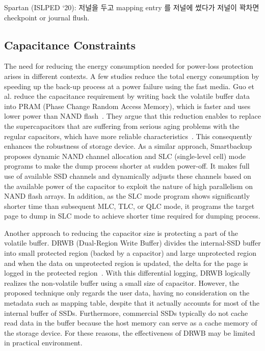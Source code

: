 Spartan (ISLPED ‘20): 저널을 두고 mapping entry 를 저널에 썼다가 저널이 꽉차면 checkpoint or journal flush. 
\fi


\subsection{Capacitance Constraints}
The need for reducing the energy consumption needed for power-loss protection
arises in different contexts. A few studies reduce the total energy consumption
by speeding up the back-up process at a power failure using the fast media. Guo
et al. reduce the capacitance requirement by writing back the volatile buffer
data into PRAM (Phase Change Random Access Memory), which is faster and uses
lower power than NAND flash~\cite{GuoYZC13date}. They argue that this reduction
enables to replace the supercapacitors that are suffering from serious aging
problems with the regular capacitors, which have more reliable
characteristics~\cite{huang2011life}. This consequently enhances the robustness
of storage device.  As a similar approach, Smartbackup~\cite{HuangWQLS15hpcc}
proposes dynamic NAND channel allocation and SLC (single-level cell) mode
programs to make the dump process shorter at sudden power-off. It makes full
use of available SSD channels and dynamically adjusts these channels based on
the available power of the capacitor to exploit the nature of high parallelism
on NAND flash arrays.  In addition, as the SLC mode program shows significantly
shorter time than subsequent MLC, TLC, or QLC mode, it programs the target page
to dump in SLC mode to achieve shorter time required for dumping process.


Another approach to reducing the capacitor size is protecting a part of the 
volatile buffer. DRWB (Dual-Region Write Buffer) divides the internal-SSD
buffer into small protected region (backed by a capacitor) and large
unprotected region and when the data on unprotected region is updated, the 
delta for the page is logged in the protected region~\cite{KimK15sac}.  With
this differential logging, DRWB logically realizes the non-volatile buffer
using a small size of capacitor. However, the proposed technique only regards
the user data, having no consideration on the metadata such as mapping table, 
despite that it actually accounts for most of the internal buffer of SSDs.  Furthermore,
commercial SSDs typically do not cache read data in the buffer because the host
memory can serve as a cache memory of the storage device. For these reasons,
the effectiveness of DRWB may be limited in practical environment. 


